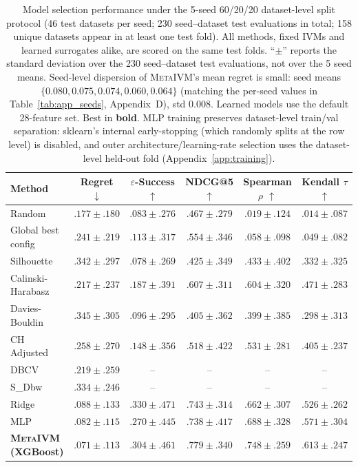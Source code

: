\documentclass[10pt]{article} %
\newcommand{\ours}{\textsc{MetaIVM}}
\begin{document}
\begin{table}[t]
\centering
\caption{Model selection performance under the 5-seed 60/20/20 dataset-level split protocol (46 test datasets per seed; 230 seed--dataset test evaluations in total; 158 unique datasets appear in at least one test fold). All methods, fixed IVMs and learned surrogates alike, are scored on the same test folds. ``$\pm$'' reports the standard deviation over the 230 seed--dataset test evaluations, not over the 5 seed means. Seed-level dispersion of \ours{}'s mean regret is small: seed means $\{0.080, 0.075, 0.074, 0.060, 0.064\}$ (matching the per-seed values in Table~\ref{tab:app_seeds}, Appendix~D), std $0.008$. Learned models use the default 28-feature set. Best in \textbf{bold}. MLP training preserves dataset-level train/val separation: sklearn's internal early-stopping (which randomly splits at the row level) is disabled, and outer architecture/learning-rate selection uses the dataset-level held-out fold (Appendix~\ref{app:training}).}
\label{tab:main}
\small
\begin{tabular}{lccccc}
\toprule
\textbf{Method} & \textbf{Regret} $\downarrow$ & \textbf{$\varepsilon$-Success} $\uparrow$ & \textbf{NDCG@5} $\uparrow$ & \textbf{Spearman} $\rho$ $\uparrow$ & \textbf{Kendall} $\tau$ $\uparrow$ \\
\midrule
Random & $.177 \pm .180$ & $.083 \pm .276$ & $.467 \pm .279$ & $.019 \pm .124$ & $.014 \pm .087$ \\
Global best config & $.241 \pm .219$ & $.113 \pm .317$ & $.554 \pm .346$ & $.058 \pm .098$ & $.049 \pm .082$ \\
\midrule
Silhouette & $.342 \pm .297$ & $.078 \pm .269$ & $.425 \pm .349$ & $.433 \pm .402$ & $.332 \pm .325$ \\
Calinski-Harabasz & $.217 \pm .237$ & $.187 \pm .391$ & $.607 \pm .311$ & $.604 \pm .320$ & $.471 \pm .283$ \\
Davies-Bouldin & $.345 \pm .305$ & $.096 \pm .295$ & $.405 \pm .362$ & $.399 \pm .385$ & $.298 \pm .313$ \\
CH Adjusted \citep{jeon2025measuring} & $.258 \pm .270$ & $.148 \pm .356$ & $.518 \pm .422$ & $.531 \pm .281$ & $.405 \pm .237$ \\
DBCV \citep{moulavi2014dbcv} & $.219 \pm .259$ & -- & -- & -- & -- \\
S\_Dbw \citep{halkidi2002clustering} & $.334 \pm .246$ & -- & -- & -- & -- \\
\midrule
Ridge & $.088 \pm .133$ & $.330 \pm .471$ & $.743 \pm .314$ & $.662 \pm .307$ & $.526 \pm .262$ \\
MLP & $.082 \pm .115$ & $.270 \pm .445$ & $.738 \pm .417$ & $.688 \pm .328$ & $.571 \pm .304$ \\
\textbf{\ours{} (XGBoost)} & $\mathbf{.071 \pm .113}$ & $\mathbf{.304 \pm .461}$ & $\mathbf{.779 \pm .340}$ & $\mathbf{.748 \pm .259}$ & $\mathbf{.613 \pm .247}$ \\
\bottomrule
\end{tabular}
\end{table}
\end{document}
